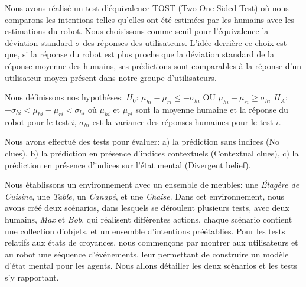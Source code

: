 \documentclass[a4paper,11pt,twoside]{StyleThese}
\begin{document}
Nous avons réalisé un test d'équivalence TOST (Two One-Sided Test) où nous comparons les intentions telles qu'elles ont été estimées par les humains avec les estimations du robot. Nous choisissons comme seuil pour l'équivalence la déviation standard $\sigma$ des réponses des utilisateurs. L'idée derrière ce choix est que, si la réponse du robot est plus proche que la déviation standard de la réponse moyenne des humains, ses prédictions sont comparables à la réponse d'un utilisateur moyen présent dans notre groupe d'utilisateurs. 

Nous définissons nos hypothèses:
$H_0$: $\mu_{hi}-\mu_{ri}\leq-\sigma_{hi}$ OU $\mu_{hi}-\mu_{ri}\geq\sigma_{hi}$
$H_A$: $-\sigma_{hi}<\mu_{hi}-\mu_{ri}<\sigma_{hi}$
où $\mu_{hi}$ et $\mu_{ri}$ sont la moyenne humaine et la réponse du robot pour le test $i$, $\sigma_{hi}$ est la variance des réponses humaines pour le test $i$.

Nous avons effectué des tests pour évaluer: a) la prédiction sans indices (No clues), b) la prédiction en présence d'indices contextuels (Contextual clues), c) la prédiction en présence d'indices sur l'état mental (Divergent belief).

Nous établissons un environnement avec un ensemble de meubles: une \textit{Étagère de Cuisine}, une \textit{Table}, un \textit{Canapé}, et une \textit{Chaise}. Dans cet environnement, nous avons créé deux scénarios, dans lesquels se déroulent plusieurs tests, avec deux humains, \textit{Max} et \textit{Bob}, qui réalisent différentes actions. chaque scénario contient une collection d'objets, et un ensemble d'intentions préétablies. Pour les tests relatifs aux états de croyances, nous commençons par montrer aux utilisateurs et au robot une séquence d'événements, leur permettant de construire un modèle d'état mental pour les agents. Nous allons détailler les deux scénarios et les tests s'y rapportant.
\end{document}
